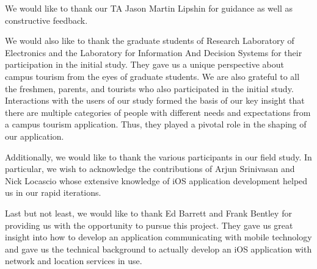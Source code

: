 \documentclass{sigchi}
\begin{document}
We would like to thank our TA Jason Martin Lipshin for guidance as well as constructive feedback. 

We would also like to thank the graduate students of Research Laboratory of Electronics and the Laboratory for Information And Decision Systems for their participation in the initial study. They gave us a unique perspective about campus tourism from the eyes of graduate students. We are also grateful to all the freshmen, parents, and tourists who also participated in the initial study. Interactions with the users of our study formed the basis of our key insight that there are multiple categories of people with different needs and expectations from a campus tourism application. Thus, they played a pivotal role in the shaping of our application. 

Additionally, we would like to thank the various participants in our field study. In particular, we wish to acknowledge the contributions of Arjun Srinivasan and Nick Locascio whose extensive knowledge of iOS application development helped us in our rapid iterations. 

Last but not least, we would like to thank Ed Barrett and Frank Bentley for providing us with the opportunity to pursue this project. They gave us great insight into how to develop an
application communicating with mobile technology and gave us the technical background to actually develop an iOS application with network and location services in use. 

%
%
%
%
%
\balance
\end{document}
